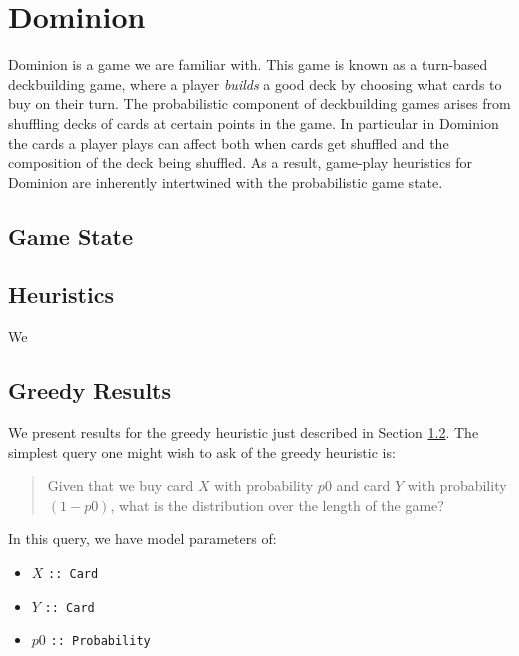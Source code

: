 
\section{Dominion} \label{sec:dom}

Dominion is a game we are familiar with. This game is known as a turn-based
deckbuilding game, where a player \emph{builds} a good deck by choosing what
cards to buy on their turn. The probabilistic component of deckbuilding games
arises from shuffling decks of cards at certain points in the game. In particular
in Dominion the cards a player plays can affect both when cards get shuffled
and the composition of the deck being shuffled. As a result, game-play heuristics
for Dominion are inherently intertwined with the probabilistic game state.

\subsection{Game State}

\subsection{Heuristics} \label{sec:dom:heuristics}
We

\subsection{Greedy Results}
We present results for the greedy heuristic just described in
Section \ref{sec:dom:heuristics}. The simplest query one might wish to ask of
the greedy heuristic is:

\begin{quote} \label{quote:dominion-query}
Given that we buy card $X$ with probability $p0$ and card $Y$ with
probability $(1 - p0)$, what is the distribution over the length of
the game?
\end{quote}

In this query, we have model parameters of:

\begin{itemize}
\item $X$  \texttt{:: Card}
\item $Y$  \texttt{:: Card}
\item $p0$ \texttt{:: Probability}
\end{itemize}

